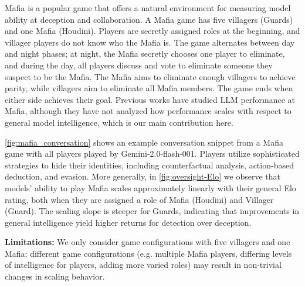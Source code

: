 \documentclass{article}
\begin{document}
Mafia is a popular game that offers a natural environment for measuring model ability at deception and collaboration.
A Mafia game has five villagers (Guards) and one Mafia (Houdini). Players are secretly assigned roles at the beginning, and villager players do not know who the Mafia is. The game alternates between day and night phases; at night, the Mafia secretly chooses one player to eliminate, and during the day, all players discuss and vote to eliminate someone they suspect to be the Mafia. The Mafia aims to eliminate enough villagers to achieve parity, while villagers aim to eliminate all Mafia members. The game ends when either side achieves their goal. Previous works \citep{yoo2024finding, guzus2025llm} have studied LLM performance at Mafia, although they have not analyzed how performance scales with respect to general model intelligence, which is our main contribution here.

\cref{fig:mafia_conversation} shows an example conversation snippet from a Mafia game with all players played by Gemini-2.0-flash-001. Players utilize sophisticated strategies to hide their identities, including counterfactual analysis, action-based deduction, and evasion. More generally, in \cref{fig:oversight-Elo} we observe that models' ability to play Mafia scales approximately linearly with their general Elo rating, both when they are assigned a role of Mafia (Houdini) and Villager (Guard). The scaling slope is steeper for Guards, indicating that improvements in general intelligence yield higher returns for detection over deception. 


\textbf{Limitations:} We only consider game configurations with five villagers and one Mafia; different game configurations (e.g. multiple Mafia players, differing levels of intelligence for players, adding more varied roles) may result in non-trivial changes in scaling behavior.
\end{document}
